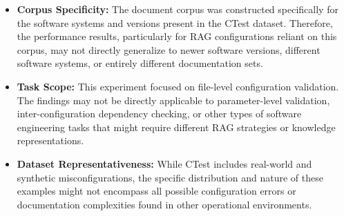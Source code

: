 \begin{itemize}
    \item \textbf{Corpus Specificity:} The document corpus was constructed specifically for the software systems and versions present in the CTest dataset. Therefore, the performance results, particularly for RAG configurations reliant on this corpus, may not directly generalize to newer software versions, different software systems, or entirely different documentation sets.
    \item \textbf{Task Scope:} This experiment focused on file-level configuration validation. The findings may not be directly applicable to parameter-level validation, inter-configuration dependency checking, or other types of software engineering tasks that might require different RAG strategies or knowledge representations.
    \item \textbf{Dataset Representativeness:} While CTest includes real-world and synthetic misconfigurations, the specific distribution and nature of these examples might not encompass all possible configuration errors or documentation complexities found in other operational environments.
\end{itemize}

